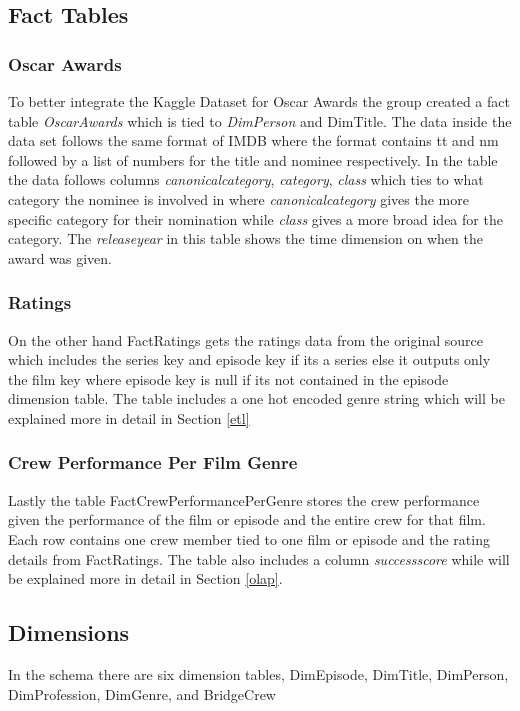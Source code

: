 \subsection{Fact Tables}
\subsubsection{Oscar Awards}
To better integrate the Kaggle Dataset for Oscar Awards the group created a fact table \textit{OscarAwards} which is tied to \textit{DimPerson} and DimTitle. The data inside the data set follows the same format of IMDB where the format contains tt and nm followed by a list of numbers for the title and nominee respectively. In the table the data follows columns \textit{canonical\textunderscore category}, \textit{category}, \textit{class} which ties to what category the nominee is involved in where \textit{canonical\textunderscore category} gives the more specific category for their nomination while \textit{class} gives a more broad idea for the category. The \textit{release\textunderscore year} in this table shows the time dimension on when the award was given. 
\subsubsection{Ratings}
On the other hand FactRatings gets the ratings data from the original source which includes the series key and episode key if its a series else it outputs only the film key where episode key is null if its not contained in the episode dimension table. The table includes a one hot encoded genre string which will be explained more in detail in Section \ref{etl}
\subsubsection{Crew Performance Per Film Genre}
Lastly the table FactCrewPerformancePerGenre stores the crew performance given the performance of the film or episode and the entire crew for that film. Each row contains one crew member tied to one film or episode and the rating details from FactRatings. The table also includes a column \textit{success\textunderscore score} while will be explained more in detail in Section \ref{olap}.

\subsection{Dimensions}
In the schema there are six dimension tables, DimEpisode, DimTitle, DimPerson, DimProfession, DimGenre, and BridgeCrew
 
